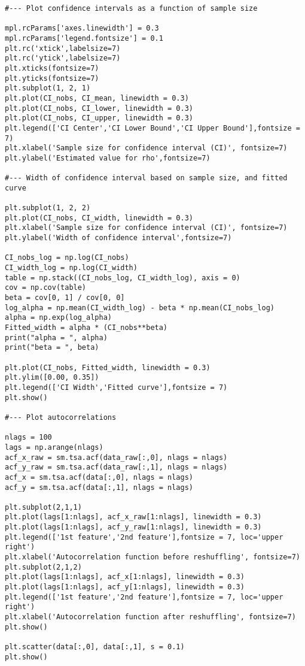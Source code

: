 \documentclass[oneside,10pt]{book}
\begin{document}
\begin{lstlisting}
#--- Plot confidence intervals as a function of sample size

mpl.rcParams['axes.linewidth'] = 0.3
mpl.rcParams['legend.fontsize'] = 0.1
plt.rc('xtick',labelsize=7)
plt.rc('ytick',labelsize=7)
plt.xticks(fontsize=7)
plt.yticks(fontsize=7)
plt.subplot(1, 2, 1)
plt.plot(CI_nobs, CI_mean, linewidth = 0.3)
plt.plot(CI_nobs, CI_lower, linewidth = 0.3)
plt.plot(CI_nobs, CI_upper, linewidth = 0.3)
plt.legend(['CI Center','CI Lower Bound','CI Upper Bound'],fontsize = 7)
plt.xlabel('Sample size for confidence interval (CI)', fontsize=7)
plt.ylabel('Estimated value for rho',fontsize=7)

#--- Width of confidence interval based on sample size, and fitted curve

plt.subplot(1, 2, 2)
plt.plot(CI_nobs, CI_width, linewidth = 0.3)
plt.xlabel('Sample size for confidence interval (CI)', fontsize=7)
plt.ylabel('Width of confidence interval',fontsize=7)

CI_nobs_log = np.log(CI_nobs)
CI_width_log = np.log(CI_width)
table = np.stack((CI_nobs_log, CI_width_log), axis = 0)
cov = np.cov(table)
beta = cov[0, 1] / cov[0, 0]
log_alpha = np.mean(CI_width_log) - beta * np.mean(CI_nobs_log)
alpha = np.exp(log_alpha)
Fitted_width = alpha * (CI_nobs**beta)
print("alpha = ", alpha)
print("beta = ", beta)

plt.plot(CI_nobs, Fitted_width, linewidth = 0.3)
plt.ylim([0.00, 0.35])
plt.legend(['CI Width','Fitted curve'],fontsize = 7)
plt.show()

#--- Plot autocorrelations

nlags = 100
lags = np.arange(nlags)
acf_x_raw = sm.tsa.acf(data_raw[:,0], nlags = nlags)
acf_y_raw = sm.tsa.acf(data_raw[:,1], nlags = nlags)
acf_x = sm.tsa.acf(data[:,0], nlags = nlags)
acf_y = sm.tsa.acf(data[:,1], nlags = nlags)

plt.subplot(2,1,1)
plt.plot(lags[1:nlags], acf_x_raw[1:nlags], linewidth = 0.3)
plt.plot(lags[1:nlags], acf_y_raw[1:nlags], linewidth = 0.3)
plt.legend(['1st feature','2nd feature'],fontsize = 7, loc='upper right')
plt.xlabel('Autocorrelation function before reshuffling', fontsize=7)
plt.subplot(2,1,2)
plt.plot(lags[1:nlags], acf_x[1:nlags], linewidth = 0.3)
plt.plot(lags[1:nlags], acf_y[1:nlags], linewidth = 0.3)
plt.legend(['1st feature','2nd feature'],fontsize = 7, loc='upper right')
plt.xlabel('Autocorrelation function after reshuffling', fontsize=7)
plt.show()

plt.scatter(data[:,0], data[:,1], s = 0.1)
plt.show()
\end{lstlisting}
\end{document}
